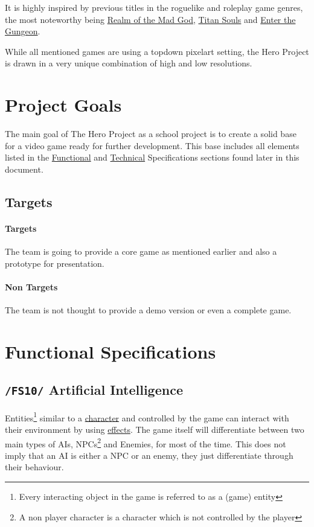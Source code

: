 \documentclass[11pt]{article}
\begin{document}
It is highly inspired by previous titles in the roguelike and roleplay game genres, the most noteworthy being \href{https://realmofthemadgod.com}{Realm of the Mad God}, \href{http://www.devolverdigital.com/games/view/titan-souls}{Titan Souls} and \href{http://dodgeroll.com/gungeon/}{Enter the Gungeon}.

While all mentioned games are using a topdown pixelart setting, the Hero Project is drawn in a very unique combination of high and low resolutions.

\section{Project Goals}
The main goal of The Hero Project as a school project is to create a solid base for a video game ready for further development.
This base includes all elements listed in the \hyperref[sec:fs]{Functional} and \hyperref[sec:ts]{Technical} Specifications sections found later in this document.

\subsection{Targets}
\paragraph{Targets}
The team is going to provide a core game as mentioned earlier and also a prototype for presentation.
\paragraph{Non Targets}
The team is not thought to provide a demo version or even a complete game.

\newpage

\section{Functional Specifications}\label{sec:fs}
\subsection{\texttt{/FS10/} Artificial Intelligence}\label{subsec:fs10ai}
Entities\footnote{Every interacting object in the game is referred to as a (game) entity} similar to a \hyperref[subsec:fs20character]{character} and controlled by the game can interact with their environment by using \hyperref[subsec:fs30effects]{effects}.
The game itself will differentiate between two main types of AIs, NPCs\footnote{A non player character is a character which is not controlled by the player} and Enemies, for most of the time. 
This does not imply that an AI is either a NPC or an enemy, they just differentiate through their behaviour.
\end{document}
